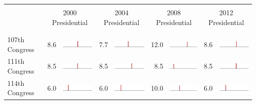 
\begin{table}
\renewcommand{\arraystretch}{0.7}
 \begin{tabular}{l rm{7em} rm{7em} rm{7em} rm{7em}}
\hline \hline \\

{} & \multicolumn{2}{c}{2000 Presidential} & \multicolumn{2}{c}{2004 Presidential} & \multicolumn{2}{c}{2008 Presidential} & \multicolumn{2}{c}{2012 Presidential} \\

\\ \hline \\
107th Congress         &   8.6 &          \includegraphics[width=7em]{mini_hist/PA_2000_107} &   7.7 &          \includegraphics[width=7em]{mini_hist/PA_2004_107} &  12.0 &          \includegraphics[width=7em]{mini_hist/PA_2008_107} &   8.6 &          \includegraphics[width=7em]{mini_hist/PA_2012_107} \\
111th Congress         &   8.5 &          \includegraphics[width=7em]{mini_hist/PA_2000_111} &   8.5 &          \includegraphics[width=7em]{mini_hist/PA_2004_111} &   8.5 &          \includegraphics[width=7em]{mini_hist/PA_2008_111} &   8.5 &          \includegraphics[width=7em]{mini_hist/PA_2012_111} \\
114th Congress         &   6.0 &          \includegraphics[width=7em]{mini_hist/PA_2000_114} &   6.0 &          \includegraphics[width=7em]{mini_hist/PA_2004_114} &  10.0 &          \includegraphics[width=7em]{mini_hist/PA_2008_114} &   6.0 &          \includegraphics[width=7em]{mini_hist/PA_2012_114} \\

\end{tabular}
\end{table}

